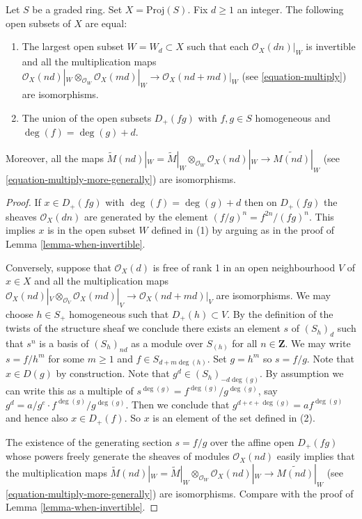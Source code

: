 \begin{lemma}
\label{lemma-where-invertible}
Let $S$ be a graded ring. Set $X = \text{Proj}(S)$. Fix $d \geq 1$ an
integer. The following open subsets of $X$ are equal:
\begin{enumerate}
\item The largest open subset $W = W_d \subset X$ such that
each $\mathcal{O}_X(dn)|_W$ is invertible and all the
multiplication maps
$\mathcal{O}_X(nd)|_W \otimes_{\mathcal{O}_W} \mathcal{O}_X(md)|_W
\to \mathcal{O}_X(nd + md)|_W$
(see \ref{equation-multiply}) are isomorphisms.
\item The union of the open subsets $D_{+}(fg)$ with
$f, g \in S$ homogeneous and $\deg(f) = \deg(g) + d$.
\end{enumerate}
Moreover, all the maps
$\widetilde M(nd)|_W = \widetilde M|_W \otimes_{\mathcal{O}_W}
\mathcal{O}_X(nd)|_W \to \widetilde{M(nd)}|_W$
(see \ref{equation-multiply-more-generally}) are isomorphisms.
\end{lemma}

\begin{proof}
If $x \in D_{+}(fg)$ with $\deg(f) = \deg(g) + d$ then
on $D_{+}(fg)$ the sheaves $\mathcal{O}_X(dn)$
are generated by the element $(f/g)^n = f^{2n}/(fg)^n$. This implies $x$
is in the open subset $W$ defined in (1) by arguing as in the
proof of Lemma \ref{lemma-when-invertible}.

\medskip\noindent
Conversely, suppose that $\mathcal{O}_X(d)$ is free of rank 1
in an open neighbourhood $V$ of $x \in X$ and all the
multiplication maps
$\mathcal{O}_X(nd)|_V \otimes_{\mathcal{O}_V} \mathcal{O}_X(md)|_V
\to \mathcal{O}_X(nd + md)|_V$ are isomorphisms.
We may choose $h \in S_{+}$ homogeneous such that $D_{+}(h) \subset V$.
By the definition of the twists of the structure sheaf we conclude there
exists an element $s$ of $(S_h)_d$ such that $s^n$ is a basis of $(S_h)_{nd}$
as a module over $S_{(h)}$ for all $n \in \mathbf{Z}$.
We may write
$s = f/h^m$ for some $m \geq 1$ and $f \in S_{d + m \deg(h)}$.
Set $g = h^m$ so $s = f/g$. Note that $x \in D(g)$ by construction.
Note that $g^d \in (S_h)_{-d\deg(g)}$.
By assumption we can write this as a multiple of
$s^{\deg(g)} = f^{\deg(g)}/g^{\deg(g)}$, say
$g^d = a/g^e \cdot f^{\deg(g)}/g^{\deg(g)}$.
Then we conclude that $g^{d + e + \deg(g)} = a f^{\deg(g)}$
and hence also $x \in D_{+}(f)$. So $x$ is an element of the set defined
in (2).

\medskip\noindent
The existence of the generating section $s = f/g$ over
the affine open $D_{+}(fg)$ whose
powers freely generate the sheaves of modules
$\mathcal{O}_X(nd)$ easily implies that the multiplication maps
$\widetilde M(nd)|_W = \widetilde M|_W \otimes_{\mathcal{O}_W}
\mathcal{O}_X(nd)|_W \to \widetilde{M(nd)}|_W$
(see \ref{equation-multiply-more-generally})
are isomorphisms. Compare with the proof of Lemma \ref{lemma-when-invertible}.
\end{proof}

